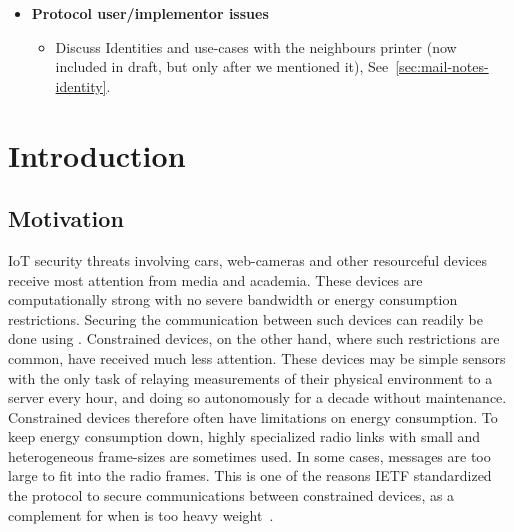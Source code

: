 \documentclass[runningheads]{llncs}
\begin{document}
{\begin{itemize}
\begin{itemize}
\begin{itemize}
                confirmation and hence explicit inj-agree also for $I$.
                \item Discuss Transcipt hashes that lag behind one message and that
                it is supposed to "cover as much as possible", but sometimes
                does not (check tamarin model also for inconsistencies between
                methods). Unclear design except "as much as possible".
                \end{itemize}
            \item{\textbf{Protocol user/implementor issues}}
                \begin{itemize}
                \item Discuss Identities and use-cases with the neighbours printer
                (now included in draft, but only after we mentioned it),
                See~\ref{sec:mail-notes-identity}.
                \end{itemize}
        \end{itemize}
\end{itemize}
}

\section{Introduction}
\label{sec:introduction}
\subsection{Motivation}
\label{sec:motivation}
IoT security threats involving cars, web-cameras and other resourceful devices
receive most attention from media and academia.
%
These devices are computationally strong with no severe bandwidth or energy
consumption restrictions.
%
Securing the communication between such devices can readily be done using
\mDandTls.
%
Constrained devices, on the other hand, where such restrictions are common,
have received much less attention.
%
These devices may be simple sensors with the only task of relaying
measurements of their physical environment to a server every hour, and doing so
autonomously for a decade without maintenance.
%
Constrained devices therefore often have limitations on energy consumption.
%
To keep energy consumption down, highly specialized radio links with small
and heterogeneous frame-sizes are sometimes used.
%
In some cases, \mDandTls messages are too large to fit into the radio frames.
%
This is one of the reasons IETF standardized the \mOscore protocol to secure
communications between constrained devices, as a complement for when \mDandTls
is too heavy weight~\cite{rfc8613}.
%
\end{document}
